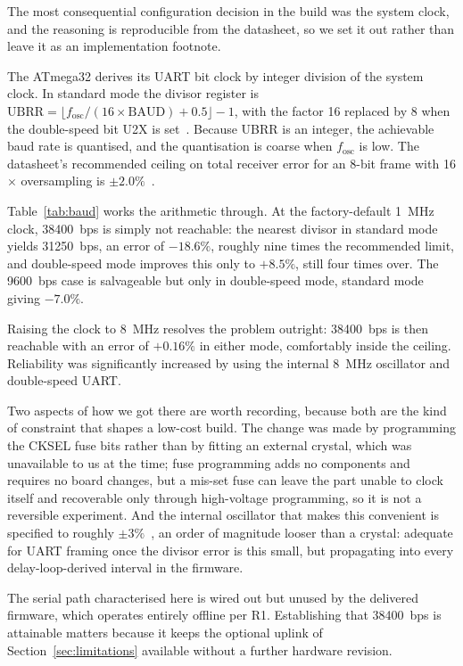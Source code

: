 The most consequential configuration decision in the build was the system clock, and the
reasoning is reproducible from the datasheet, so we set it out rather than leave it as an
implementation footnote.

The ATmega32 derives its UART bit clock by integer division of the system clock. In
standard mode the divisor register is
$\mathrm{UBRR} = \lfloor f_{\mathrm{osc}} / (16 \times \mathrm{BAUD}) + 0.5 \rfloor - 1$,
with the factor 16 replaced by 8 when the double-speed bit U2X is
set~\cite{microchip2020}. Because UBRR is an integer, the achievable baud rate is
quantised, and the quantisation is coarse when $f_{\mathrm{osc}}$ is low. The datasheet's
recommended ceiling on total receiver error for an 8-bit frame with 16$\times$
oversampling is $\pm 2.0\%$~\cite{microchip2020}.



Table~\ref{tab:baud} works the arithmetic through. At the factory-default 1~MHz clock,
38400~bps is simply not reachable: the nearest divisor in standard mode yields 31250~bps,
an error of $-18.6\%$, roughly nine times the recommended limit, and double-speed mode
improves this only to $+8.5\%$, still four times over. The 9600~bps case is salvageable but
only in double-speed mode, standard mode giving $-7.0\%$.

Raising the clock to 8~MHz resolves the problem outright: 38400~bps is then reachable with
an error of $+0.16\%$ in either mode, comfortably inside the ceiling. Reliability was
significantly increased by using the internal 8~MHz oscillator and double-speed UART.

Two aspects of how we got there are worth recording, because both are the kind of
constraint that shapes a low-cost build. The change was made by programming the CKSEL fuse
bits rather than by fitting an external crystal, which was unavailable to us at the time;
fuse programming adds no components and requires no board changes, but a mis-set fuse can
leave the part unable to clock itself and recoverable only through high-voltage
programming, so it is not a reversible experiment. And the internal oscillator that makes
this convenient is specified to roughly $\pm 3\%$~\cite{microchip2020}, an order of
magnitude looser than a crystal: adequate for UART framing once the divisor error is this
small, but propagating into every delay-loop-derived interval in the firmware.

The serial path characterised here is wired out but unused by the delivered firmware, which
operates entirely offline per R1. Establishing that 38400~bps is attainable matters because
it keeps the optional uplink of Section~\ref{sec:limitations} available without a further
hardware revision.
